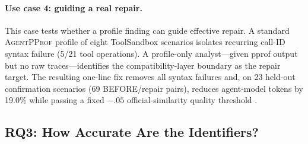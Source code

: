 \documentclass[sigconf,nonacm]{acmart}
\newif\ifshowappendix
\newcommand{\appnote}[1]{\ifshowappendix{} (#1)\fi}
\newcommand{\sys}{\textsc{AgentPProf}\xspace}
\begin{document}
\paragraph{Use case 4: guiding a real repair.}
This case tests whether a profile finding can guide effective repair.
A standard \sys profile of eight ToolSandbox scenarios isolates recurring
call-ID syntax failure (5/21 tool operations).
A profile-only analyst---given pprof output but no raw traces---identifies the
compatibility-layer boundary as the repair target.
The resulting one-line fix removes all syntax failures and, on 23 held-out
confirmation scenarios (69 BEFORE/repair pairs), reduces agent-model tokens
by 19.0\% while passing a fixed $-.05$ official-similarity quality threshold
\appnote{details in Appendix~\ref{app:rq2-repair}}.

\subsection{RQ3: How Accurate Are the Identifiers?}
\end{document}
